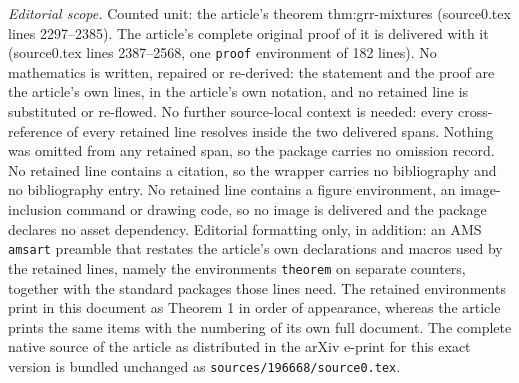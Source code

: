 \documentclass[10pt,a4paper]{amsart}
\begin{document}
\noindent\textit{Editorial scope.} Counted unit: the article's theorem thm:grr-mixtures (source0.tex lines 2297--2385). The article's complete original proof of it is delivered with it (source0.tex lines 2387--2568, one \texttt{proof} environment of 182 lines). No mathematics is written, repaired or re-derived: the statement and the proof are the article's own lines, in the article's own notation, and no retained line is substituted or re-flowed.  No further source-local context is needed: every cross-reference of every retained line resolves inside the two delivered spans.  Nothing was omitted from any retained span, so the package carries no omission record.  No retained line contains a citation, so the wrapper carries no bibliography and no bibliography entry.  No retained line contains a figure environment, an image-inclusion command or drawing code, so no image is delivered and the package declares no asset dependency.  Editorial formatting only, in addition: an AMS \texttt{amsart} preamble that restates the article's own declarations and macros used by the retained lines, namely the environments \texttt{theorem} on separate counters, together with the standard packages those lines need.  The retained environments print in this document as Theorem 1 in order of appearance, whereas the article prints the same items with the numbering of its own full document.  The complete native source of the article as distributed in the arXiv e-print for this exact version is bundled unchanged as \texttt{sources/196668/source0.tex}.
\end{document}
